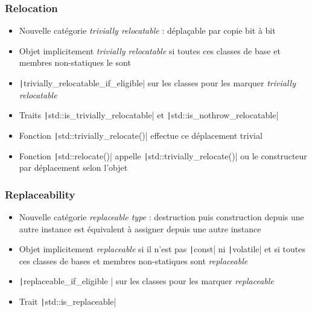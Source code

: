 \documentclass[C++.tex]{subfiles}
\begin{document}
\begin{frame}[fragile]
	\frametitle{Relocation}
	\begin{itemize}
		\item Nouvelle catégorie \textit{trivially relocatable} : déplaçable par copie bit à bit


		\item Objet implicitement \textit{trivially relocatable} si toutes ces classes de base et membres non-statiques le sont
		\item \texttt|trivially_relocatable_if_eligible| sur les classes pour les marquer \textit{trivially relocatable}
		\item Traits \texttt|std::is_trivially_relocatable| et \texttt|std::is_nothrow_relocatable|
		\item Fonction \texttt|std::trivially_relocate()| effectue ce déplacement trivial
		\item Fonction \texttt|std::relocate()| appelle \texttt|std::trivially_relocate()| ou le constructeur par déplacement selon l'objet
	\end{itemize}

\end{frame}

\begin{frame}[fragile]
	\frametitle{Replaceability}
	\begin{itemize}
		\item Nouvelle catégorie \textit{replaceable type} : destruction puis construction depuis une autre instance est équivalent à assigner depuis une autre instance
		\item Objet implicitement \textit{replaceable} si il n'est pas \texttt|const| ni \texttt|volatile| et si toutes ces classes de bases et membres non-statiques sont \textit{replaceable}


		\item \texttt|replaceable_if_eligible | sur les classes pour les marquer \textit{replaceable}
		\item Trait \texttt|std::is_replaceable|
	\end{itemize}

\end{frame}
\end{document}
